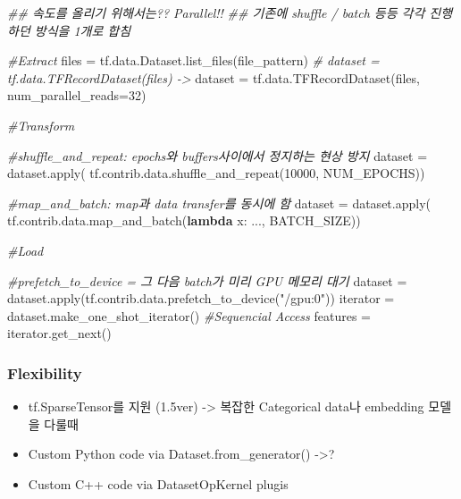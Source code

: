 \documentclass[11pt]{article}
\newenvironment{Shaded}{}{}
\newcommand{\KeywordTok}[1]{\textcolor[rgb]{0.00,0.44,0.13}{\textbf{{#1}}}}
\newcommand{\DecValTok}[1]{\textcolor[rgb]{0.25,0.63,0.44}{{#1}}}
\newcommand{\StringTok}[1]{\textcolor[rgb]{0.25,0.44,0.63}{{#1}}}
\newcommand{\CommentTok}[1]{\textcolor[rgb]{0.38,0.63,0.69}{\textit{{#1}}}}
\newcommand{\NormalTok}[1]{{#1}}
\newcommand{\OperatorTok}[1]{\textcolor[rgb]{0.40,0.40,0.40}{{#1}}}
\newcommand{\BuiltInTok}[1]{{#1}}
\begin{document}
\begin{Shaded}
\begin{Highlighting}[]

\CommentTok{## 속도를 올리기 위해서는?? Parallel!!}
\CommentTok{## 기존에 shuffle / batch 등등 각각 진행하던 방식을 1개로 합침}

\CommentTok{#Extract}
\NormalTok{files }\OperatorTok{=}\NormalTok{ tf.data.Dataset.list_files(file_pattern)}
\CommentTok{# dataset = tf.data.TFRecordDataset(files) ->}
\NormalTok{dataset }\OperatorTok{=}\NormalTok{ tf.data.TFRecordDataset(files, num_parallel_reads}\OperatorTok{=}\DecValTok{32}\NormalTok{)}

\CommentTok{#Transform}

\CommentTok{#shuffle_and_repeat: epochs와 buffers사이에서 정지하는 현상 방지}
\NormalTok{dataset }\OperatorTok{=}\NormalTok{ dataset.}\BuiltInTok{apply}\NormalTok{(}
\NormalTok{    tf.contrib.data.shuffle_and_repeat(}\DecValTok{10000}\NormalTok{, NUM_EPOCHS))}

\CommentTok{#map_and_batch: map과 data transfer를 동시에 함}
\NormalTok{dataset }\OperatorTok{=}\NormalTok{ dataset.}\BuiltInTok{apply}\NormalTok{(}
\NormalTok{    tf.contrib.data.map_and_batch(}\KeywordTok{lambda}\NormalTok{ x: ..., BATCH_SIZE))}

\CommentTok{#Load}

\CommentTok{#prefetch_to_device = 그 다음 batch가 미리 GPU 메모리 대기}
\NormalTok{dataset }\OperatorTok{=}\NormalTok{ dataset.}\BuiltInTok{apply}\NormalTok{(tf.contrib.data.prefetch_to_device(}\StringTok{"/gpu:0"}\NormalTok{))}
\NormalTok{iterator }\OperatorTok{=}\NormalTok{ dataset.make_one_shot_iterator() }\CommentTok{#Sequencial Access}
\NormalTok{features }\OperatorTok{=}\NormalTok{ iterator.get_next()}
\end{Highlighting}
\end{Shaded}

    \hypertarget{flexibility}{%
\subsubsection{Flexibility}\label{flexibility}}

\begin{itemize}
\item
  tf.SparseTensor를 지원 (1.5ver) -\textgreater{} 복잡한 Categorical
  data나 embedding 모델을 다룰때
\item
  Custom Python code via Dataset.from\_generator() -\textgreater{}?
\item
  Custom C++ code via DatasetOpKernel plugis
\end{itemize}
\end{document}
